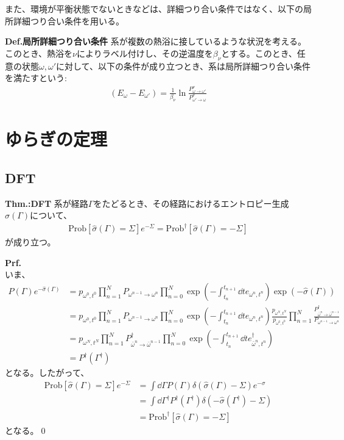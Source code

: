 \documentclass[a4paper,11pt]{jsarticle}
\numberwithin{equation}{section}
\begin{document}
また、環境が平衡状態でないときなどは、詳細つり合い条件ではなく、以下の局所詳細つり合い条件を用いる。
\begin{itembox}[l]{\textbf{Def.局所詳細つり合い条件}}
  系が複数の熱浴に接しているような状況を考える。このとき、熱浴を$\nu$によりラベル付けし、その逆温度を$\beta_{\nu}$とする。このとき、任意の状態$\omega,\omega'$に対して、以下の条件が成り立つとき、系は局所詳細つり合い条件を満たすという:
  \begin{align}
    (E_{\omega} - E_{\omega'}) = \frac{1}{\beta_{\nu}}\ln \frac{P^{\nu}_{\omega \to \omega'}}{P^{\nu}_{\omega' \to \omega}}
  \end{align}
\end{itembox}


\section{ゆらぎの定理}
\subsection{DFT}
\begin{itembox}[l]{\textbf{Thm.:DFT}}
  系が経路$\Gamma$をたどるとき、その経路におけるエントロピー生成$\hat{\sigma}(\Gamma)$について、
  \begin{align}
    \text{Prob}[\hat{\sigma}(\Gamma) = \Sigma]e^{-\Sigma} = \text{Prob}^{\dagger}[\hat{\sigma}(\Gamma) = -\Sigma]
  \end{align}
  が成り立つ。
\end{itembox}
\textbf{Prf.}\\
いま、
\begin{align}
  P(\Gamma)e^{-\hat{\sigma}(\Gamma)} &=p_{\omega^0,t^0}\prod_{n=1}^{N}P_{\omega^{n-1} \to \omega^n} \prod_{n=0}^{N}\exp(-\int_{t_n}^{t_{n+1}}\dd{t}e_{\omega^n,t^n})\exp(-\hat{\sigma}(\Gamma))\\
  &=p_{\omega^0,t^0}\prod_{n=1}^{N}P_{\omega^{n-1} \to \omega^n} \prod_{n=0}^{N}\exp(-\int_{t_n}^{t_{n+1}}\dd{t}e_{\omega^n,t^n}) \frac{p_{\omega^N,t^N}}{p_{\omega^0,t^0}}\prod_{n=1}^{N}\frac{P^{\dagger}_{\bar{\omega}^n \to \bar{\omega}^{n-1}}}{P_{\omega^{n-1} \to \omega^n}}\\
  &=p_{\omega^N,t^N}\prod_{n=1}^{N}P^{\dagger}_{\bar{\omega}^{n} \to \bar{\omega}^{n-1}} \prod_{n=0}^{N}\exp(-\int_{t_n}^{t_{n+1}}\dd{t}e^{\dagger}_{\bar{\omega}^n,t^n})\\
  &=P^{\dagger}(\Gamma^{\dagger})
\end{align}
となる。したがって、
\begin{align}
  \text{Prob}[\hat{\sigma}(\Gamma) = \Sigma]e^{-\Sigma} &= \int \dd{\Gamma}P(\Gamma)\delta(\hat{\sigma}(\Gamma) - \Sigma)e^{-\sigma}\\
  &= \int \dd{\Gamma^{\dagger}}P^{\dagger}(\Gamma^{\dagger})\delta(-\hat{\sigma}(\Gamma^{\dagger}) - \Sigma)\\
  &= \text{Prob}^{\dagger}[\hat{\sigma}(\Gamma) = -\Sigma]
\end{align}
となる。\qed
\end{document}
